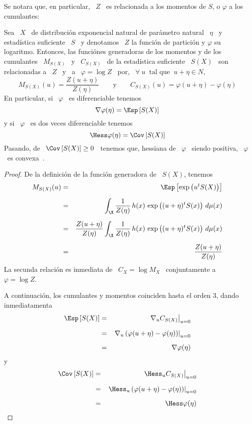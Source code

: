 Se notara que,  en particular, \ $Z$ \  es relacionada a los momentos  de $S$, o
$\varphi$ a los cumulantes:
%
\begin{teorema}
%
  Sea \  $X$ \  de distribuci\'on exponencial  natural de par\'ametro  natural \
  $\eta$ \ y estad\'istica suficiente \ $S$  \ y denotamos \ $Z$ la funci\'on de
  partici\'on y  $\varphi$ su logaritmo.  Entonces,  las funci\'ones generadoras
  de los  momentos y de  los cumulantes \  $M_{S(X)}$ \ y  \ $C_{S(X)}$ \  de la
  estad\'istica  suficiente \  $S(X)$ \  son relacionadas  a  \ $Z$  \ y  \ a  \
  $\varphi = \log  Z$ \ por, \ $\forall \:  u \: \mbox{ tal que  } \: u+\eta \in
  N$,
  \[
  M_{S(X)}(u) =  \frac{Z(u+\eta)}{Z(\eta)} \qquad \mbox{y}  \qquad C_{S(X)}(u) =
  \varphi(u+\eta) - \varphi(\eta)
  \]
  En particular, si \  $\varphi$ \ es diferenciable tenemos
  \[
  \nabla \varphi (\eta) = \Esp\left[ S(X) \right]
  \]
  y si \ $\varphi$ \ es dos veces diferenciable tenemos
  \[
  \Hess \varphi (\eta) = \Cov\left[ S(X) \right]
  \]
  Pasando, de  \ $\Cov\left[ S(X)  \right] \ge 0$  \ tenemos que, hessiana  de \
  $\varphi$ \ siendo positiva, \ $\varphi$ \ es convexa~\cite{CamMar09}.
%
\end{teorema}
%
\begin{proof}
  De la definici\'on de la funci\'on generadora de \ $S(X)$, tenemos
  \begin{eqnarray*}
  M_{S(X)}(u) & = &\Esp\left[ \exp\left( u^t S(X) \right) \right]\\[2mm]
  & = & \int_\X \frac{1}{Z(\eta)} \, h(x) \, \exp\left( (u + \eta)^t S(x) \right) \,
  d\mu(x)\\[2mm]
  & = & \frac{Z(u+\eta)}{Z(\eta)} \int_\X \frac{1}{Z(\eta)} \, h(x) \,
  \exp\left( (u + \eta)^t S(x) \right) \, d\mu(x)\\[2mm]
  & = &  \frac{Z(u+\eta)}{Z(\eta)}
  \end{eqnarray*}
  La secunda  relaci\'on es inmediata  de \ $C_X  = \log M_X$ \  conjuntamente a
  \ $\varphi = \log Z$.

  A continuaci\'on, los cumulantes y momentos coinciden hasta el orden $3$, dando inmediatamenta
  \begin{eqnarray*}
  \Esp\left[ S(X) \right] & = & \left. \nabla_u C_{S(X)} \right|_{u=0}\\[2mm]
  & = & \left. \nabla_u \left( \varphi(u+\eta) - \varphi(\eta) \right) \right|_{u=0}\\[2mm]
  & = & \nabla \varphi(\eta)
  \end{eqnarray*}
  y
  \begin{eqnarray*}
  \Cov\left[ S(X) \right] & = & \left. \Hess_u C_{S(X)} \right|_{u=0}\\[2mm]
  & = & \left. \Hess_u \left( \varphi(u+\eta) - \varphi(\eta)  \right) \right|_{u=0}\\[2mm]
  & = & \Hess \varphi(\eta)
  \end{eqnarray*}
\end{proof}

